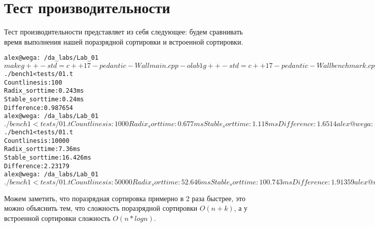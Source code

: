 \section{Тест производительности}


Тест производительности представляет из себя следующее: будем сравнивать время выполнения нашей поразрядной сортировки и 
встроенной сортировки.

\begin{alltt}
alex@wega:~/da_labs/Lab_01$ make
g++ -std=c++17 -pedantic -Wall main.cpp -o lab1
g++ -std=c++17 -pedantic -Wall benchmark.cpp -o bench1
alex@wega:~/da_labs/Lab_01$ ./bench1 < tests/01.t
Count lines is: 100
Radix_sort time: 0.243 ms
Stable_sort time: 0.24 ms
Difference: 0.987654
alex@wega:~/da_labs/Lab_01$ ./bench1 < tests/01.t
Count lines is: 1000
Radix_sort time: 0.677 ms
Stable_sort time: 1.118 ms
Difference: 1.6514
alex@wega:~/da_labs/Lab_01$ ./bench1 < tests/01.t
Count lines is: 10000
Radix_sort time: 7.36 ms
Stable_sort time: 16.426 ms
Difference: 2.23179
alex@wega:~/da_labs/Lab_01$ ./bench1 < tests/01.t
Count lines is: 50000
Radix_sort time: 52.646 ms
Stable_sort time: 100.743 ms
Difference: 1.91359
alex@wega:~/da_labs/Lab_01$
\end{alltt}

Можем заметить, что поразрядная сортировка примерно в 2 раза быстрее, это можно объяснить тем, что сложность поразрядной сортировки
$O(n + k)$, а у встроенной сортировки сложность $O(n*log n)$. 

\pagebreak
